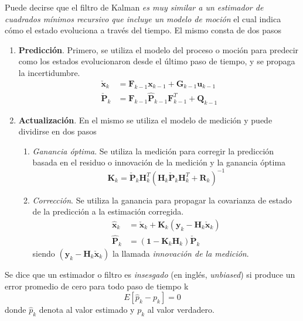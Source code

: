 Puede decirse que el filtro de Kalman \textit{es muy similar a un estimador de cuadrados mínimos recursivo que incluye un modelo de moción} el cual indica cómo el estado evoluciona a través del tiempo. El mismo consta de dos pasos
\begin{enumerate}
    \item \textbf{Predicción}. Primero, se utiliza el modelo del proceso o moción para predecir como los estados evolucionaron desde el último paso de tiempo, y se propaga la incertidumbre.
    \begin{align}
        \check{\bm{x}}_k &= \bm{F}_{k-1}\bm{x}_{k-1}+\bm{G}_{k-1}\bm{u}_{k-1} \\
        \check{\bm{P}}_k &= \bm{F}_{k-1}\hat{\bm{P}}_{k-1}\bm{F}_{k-1}^T + \bm{Q}_{k-1}
    \end{align}
    \item \textbf{Actualización}. En el mismo se utiliza el modelo de medición y puede dividirse en dos pasos
    \begin{enumerate}
        \item \textit{Ganancia óptima}. Se utiliza la medición para corregir la predicción basada en el residuo o innovación de la medición y la ganancia óptima
        \begin{equation}
            \bm{K}_k = \check{\bm{P}}_{k}\bm{H}_k^T\left(\bm{H}_k\check{\bm{P}}_k\bm{H}_k^T + \bm{R}_k\right)^{-1}
        \end{equation}
        \item \textit{Corrección}. Se utiliza la ganancia para propagar la covarianza de estado de la predicción a la estimación corregida.
        \begin{align}
            \hat{\bm{x}}_k &= \check{\bm{x}}_k + \bm{K}_k\left(\bm{y}_k - \bm{H}_k\check{\bm{x}}_k\right) \\
            \hat{\bm{P}}_k &= (\bm{1} - \bm{K}_k\bm{H}_k)\check{\bm{P}}_k
        \end{align}
        siendo $(\bm{y}_k - \bm{H}_k\check{\bm{x}}_k)$ la llamada \textit{innovación de la medición}.
    \end{enumerate}
\end{enumerate}

Se dice que un estimador o filtro es \textit{insesgado} (en inglés, \textit{unbiased}) si produce un error promedio de cero para todo paso de tiempo k
\begin{equation}
    E[\hat{p}_k-p_k] = 0
\end{equation}
donde $\hat{p}_k$ denota al valor estimado y $p_k$ al valor verdadero.

